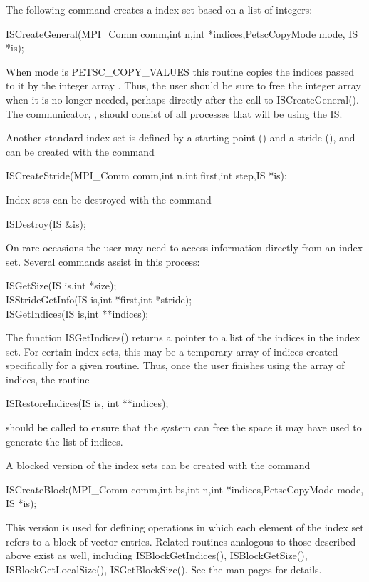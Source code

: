 The following command creates a index set based on a list
of integers:
\begin{tabbing}
  ISCreateGeneral(MPI\_Comm comm,int n,int *indices,PetscCopyMode mode, IS *is);
\end{tabbing}
When mode is PETSC\_COPY\_VALUES this routine copies the  indices passed
to it by the integer array .
Thus, the user should be sure to free the integer array 
when it is no longer needed, perhaps directly after the call to
ISCreateGeneral(). The communicator, , should consist of all
processes that will be using the IS.

Another standard index set is defined by a starting point () and a
stride (),  and can be created with the command
\begin{tabbing}
  ISCreateStride(MPI\_Comm comm,int n,int first,int step,IS *is);
\end{tabbing}

Index sets can be destroyed with the command
\begin{tabbing}
  ISDestroy(IS \&is);
\end{tabbing}

On rare occasions the user may need to access information directly
from an index set.
Several commands
assist in this process:
\begin{tabbing}
  ISGetSize(IS is,int *size);\\
  ISStrideGetInfo(IS is,int *first,int *stride);\\
  ISGetIndices(IS is,int **indices);
\end{tabbing}
The function ISGetIndices() returns a pointer to a list of the
indices in the index set.
For certain index sets, this may be a
temporary array of indices created specifically for a given routine.
Thus, once the user finishes using the array of indices,
the routine
\begin{tabbing}
  ISRestoreIndices(IS is, int **indices);
\end{tabbing}
should be called to ensure that the system can free the space it
may have used to generate the list of indices.

A blocked version of the index sets can be created with the command
\begin{tabbing}
  ISCreateBlock(MPI\_Comm comm,int bs,int n,int *indices,PetscCopyMode mode, IS *is);
\end{tabbing}
This version is used for defining operations in which each element of the index
set refers to a block of  vector entries.  Related routines analogous
to those described above exist as well, including
ISBlockGetIndices(), ISBlockGetSize(), ISBlockGetLocalSize(), ISGetBlockSize().
See the man pages for details.

